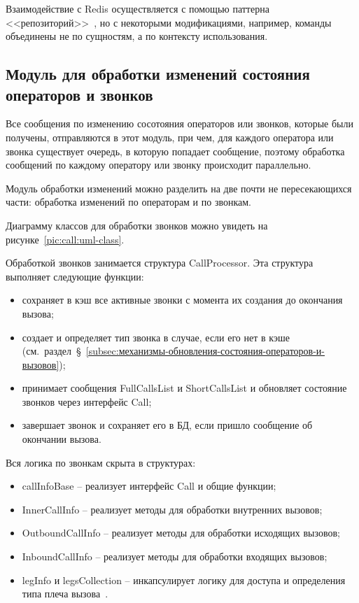 Взаимодействие с Redis осуществляется с помощью паттерна <<репозиторий>>~\cite{RepositoryDesignPattern},
но с некоторыми модификациями, например, команды объединены не по сущностям, а по контексту использования.

\subsection{Модуль для обработки изменений состояния операторов и звонков}\label{subsec:модуль-для-обработки-изменений-состояния-операторов-и-звонков}

Все сообщения по изменению сосотояния операторов или звонков, которые были получены,
отправляются в этот модуль, при чем,
для каждого оператора или звонка существует очередь, в которую попадает сообщение,
поэтому обработка сообщений по каждому оператору или звонку происходит параллельно.

Модуль обработки изменений можно разделить на две почти не пересекающихся части: обработка изменений по операторам и по звонкам.

Диаграмму классов для обработки звонков можно увидеть на рисунке~\ref{pic:call:uml-class}.


Обработкой звонков занимается структура CallProcessor.
Эта структура выполняет следующие функции:
\begin{itemize}
    \item сохраняет в кэш все активные звонки с момента их создания до окончания вызова;
    \item создает и определяет тип звонка в случае, если его нет в кэше (см.~раздел~\S~\ref{subsec:механизмы-обновления-состояния-операторов-и-вызовов});
    \item принимает сообщения FullCallsList и ShortCallsList и обновляет состояние звонков через интерфейс Call;
    \item завершает звонок и сохраняет его в БД, если пришло сообщение об окончании вызова.
\end{itemize}

Вся логика по звонкам скрыта в структурах:
\begin{itemize}
    \item callInfoBase -- реализует интерфейс Call и общие функции;
    \item InnerCallInfo -- реализует методы для обработки внутренних вызовов;
    \item OutboundCallInfo -- реализует методы для обработки исходящих вызовов;
    \item InboundCallInfo -- реализует методы для обработки входящих вызовов;
    \item legInfo и legsCollection -- инкапсулирует логику для доступа и определения типа плеча вызова~\cite{doc:Call_Structure}.
\end{itemize}

